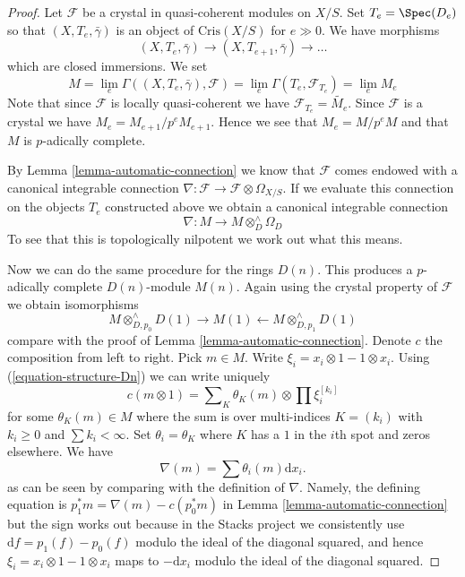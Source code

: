 \begin{proof}
Let $\mathcal{F}$ be a crystal in quasi-coherent modules on $X/S$.
Set $T_e = \Spec(D_e)$ so that $(X, T_e, \bar\gamma)$ is an object
of $\text{Cris}(X/S)$ for $e \gg 0$. We have morphisms
$$
(X, T_e, \bar\gamma) \to (X, T_{e + 1}, \bar\gamma) \to \ldots
$$
which are closed immersions. We set
$$
M =
\lim_e \Gamma((X, T_e, \bar\gamma), \mathcal{F}) =
\lim_e \Gamma(T_e, \mathcal{F}_{T_e}) = \lim_e M_e
$$
Note that since $\mathcal{F}$ is locally quasi-coherent we have
$\mathcal{F}_{T_e} = \widetilde{M_e}$. Since $\mathcal{F}$ is a
crystal we have $M_e = M_{e + 1}/p^eM_{e + 1}$. Hence we see that
$M_e = M/p^eM$ and that $M$ is $p$-adically complete.

\medskip\noindent
By Lemma \ref{lemma-automatic-connection} we know that $\mathcal{F}$
comes endowed with a canonical integrable connection
$\nabla : \mathcal{F} \to \mathcal{F} \otimes \Omega_{X/S}$.
If we evaluate this connection on the objects $T_e$ constructed above
we obtain a canonical integrable connection
$$
\nabla : M \longrightarrow M \otimes^\wedge_D \Omega_D
$$
To see that this is topologically nilpotent we work out what this means.

\medskip\noindent
Now we can do the same procedure for the rings $D(n)$.
This produces a $p$-adically complete $D(n)$-module $M(n)$. Again using
the crystal property of $\mathcal{F}$ we obtain isomorphisms
$$
M \otimes^\wedge_{D, p_0} D(1) \rightarrow M(1)
\leftarrow M \otimes^\wedge_{D, p_1} D(1)
$$
compare with the proof of Lemma \ref{lemma-automatic-connection}.
Denote $c$ the composition from left to right. Pick $m \in M$.
Write $\xi_i = x_i \otimes 1 - 1 \otimes x_i$.
Using (\ref{equation-structure-Dn}) we can write uniquely
$$
c(m \otimes 1) = \sum\nolimits_K \theta_K(m) \otimes \prod \xi_i^{[k_i]}
$$
for some $\theta_K(m) \in M$ where the sum is over multi-indices
$K = (k_i)$ with $k_i \geq 0$ and $\sum k_i < \infty$. Set
$\theta_i = \theta_K$ where $K$ has a $1$ in the $i$th spot and
zeros elsewhere. We have
$$
\nabla(m) = \sum \theta_i(m) \text{d}x_i.
$$
as can be seen by comparing with the definition of
$\nabla$. Namely, the defining equation is
$p_1^*m = \nabla(m) - c(p_0^*m)$ in Lemma \ref{lemma-automatic-connection}
but the sign works out because in the Stacks project we consistently use
$\text{d}f = p_1(f) - p_0(f)$ modulo the ideal of the diagonal squared,
and hence $\xi_i = x_i \otimes 1 - 1 \otimes x_i$ maps to $-\text{d}x_i$
modulo the ideal of the diagonal squared.


\end{proof}
